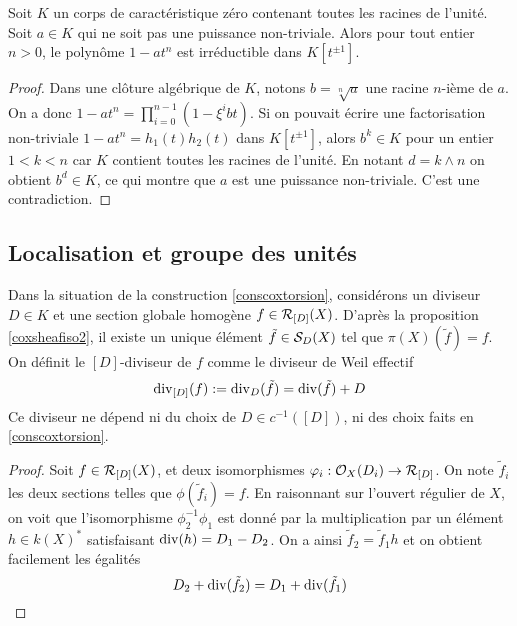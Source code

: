 \begin{lem}
Soit $K$ un corps de caractéristique zéro contenant toutes les racines de l'unité. Soit $a\in K$ qui ne soit pas une puissance non-triviale. Alors pour tout entier $n> 0$, le polynôme $1-at^n$ est irréductible dans $K[t^{\pm 1}]$.
\end{lem}
\begin{proof}
Dans une clôture algébrique de $K$, notons $b=\sqrt[n]{a}$ une racine $n$-ième de $a$. On a donc $1-at^n=\prod_{i=0}^{n-1}(1-\xi^i bt)$. Si on pouvait écrire une factorisation non-triviale $1-at^n=h_1(t)h_2(t)$ dans $K[t^{\pm 1}]$, alors $b^k\in K$ pour un entier $1<k<n$ car $K$ contient toutes les racines de l'unité. En notant $d=k\wedge n$ on obtient $b^d\in K$, ce qui montre que $a$ est une puissance non-triviale. C'est une contradiction.
\end{proof}

\subsection{Localisation et groupe des unités}

\begin{cons}\label{conscoxtorsionDDiviseur}
Dans la situation de la construction \ref{conscoxtorsion}, considérons un diviseur $D\in K$ et une section globale homogène $f\in\mathcal{R}_{[D]}(X)$. D'après la proposition \ref{coxsheafiso2}, il existe un unique élément $\tilde{f}\in\mathcal{S}_D(X)$ tel que $\pi(X)(\tilde{f})=f$. On définit le $[D]$-diviseur de $f$ comme le diviseur de Weil effectif
$$\operatorname{div}_{[D]}(f):=\operatorname{div}_D(\tilde{f})=\operatorname{div}(\tilde{f})+D$$
Ce diviseur ne dépend ni du choix de $D\in c^{-1}([D])$, ni des choix faits en \ref{conscoxtorsion}.
\end{cons}
\begin{proof}
Soit $f\in\mathcal{R}_{[D]}(X)$, et deux isomorphismes $\varphi_i:\mathcal{O}_X(D_i)\rightarrow \mathcal{R}_{[D]}$. On note $\tilde{f}_i$ les deux sections telles que $\phi(\tilde{f}_i)=f$. En raisonnant sur l'ouvert régulier de $X$, on voit que l'isomorphisme $\phi_2^{-1}\phi_1$ est donné par la multiplication par un élément $h\in k(X)^*$ satisfaisant $\operatorname{div}(h)=D_1-D_2$. On a ainsi $\tilde{f}_2=\tilde{f}_1h$ et on obtient facilement les égalités
$$D_2+\operatorname{div}(\tilde{f}_2)=D_1+\operatorname{div}(\tilde{f}_1)$$
\end{proof}


